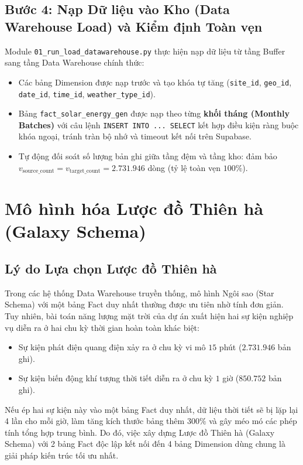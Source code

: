 \documentclass[12pt, a4paper]{report}
\begin{document}
\subsection{Bước 4: Nạp Dữ liệu vào Kho (Data Warehouse Load) và Kiểm định Toàn vẹn}
Module \texttt{01\_run\_load\_datawarehouse.py} thực hiện nạp dữ liệu từ tầng Buffer sang tầng Data Warehouse chính thức:
\begin{itemize}[leftmargin=*]
    \item Các bảng Dimension được nạp trước và tạo khóa tự tăng (\texttt{site\_id}, \texttt{geo\_id}, \texttt{date\_id}, \texttt{time\_id}, \texttt{weather\_type\_id}).
    \item Bảng \texttt{fact\_solar\_energy\_gen} được nạp theo từng \textbf{khối tháng (Monthly Batches)} với câu lệnh \texttt{INSERT INTO ... SELECT} kết hợp điều kiện ràng buộc khóa ngoại, tránh tràn bộ nhớ và timeout kết nối trên Supabase.
    \item Tự động đối soát số lượng bản ghi giữa tầng đệm và tầng kho: đảm bảo $v_{\text{source\_count}} = v_{\text{target\_count}} = 2.731.946$ dòng (tỷ lệ toàn vẹn $100\%$).
\end{itemize}
\newpage
\section{Mô hình hóa Lược đồ Thiên hà (Galaxy Schema)}
\label{sec:galaxy_modeling}

\subsection{Lý do Lựa chọn Lược đồ Thiên hà}
Trong các hệ thống Data Warehouse truyền thống, mô hình Ngôi sao (Star Schema) với một bảng Fact duy nhất thường được ưu tiên nhờ tính đơn giản. Tuy nhiên, bài toán năng lượng mặt trời của dự án xuất hiện hai sự kiện nghiệp vụ diễn ra ở hai chu kỳ thời gian hoàn toàn khác biệt:
\begin{itemize}[noitemsep]
    \item Sự kiện phát điện quang điện xảy ra ở chu kỳ vi mô $15$ phút ($2.731.946$ bản ghi).
    \item Sự kiện biến động khí tượng thời tiết diễn ra ở chu kỳ $1$ giờ ($850.752$ bản ghi).
\end{itemize}
Nếu ép hai sự kiện này vào một bảng Fact duy nhất, dữ liệu thời tiết sẽ bị lặp lại 4 lần cho mỗi giờ, làm tăng kích thước bảng thêm $300\%$ và gây méo mó các phép tính tổng hợp trung bình. Do đó, việc xây dựng Lược đồ Thiên hà (Galaxy Schema) với 2 bảng Fact độc lập kết nối đến 4 bảng Dimension dùng chung là giải pháp kiến trúc tối ưu nhất.
\end{document}
